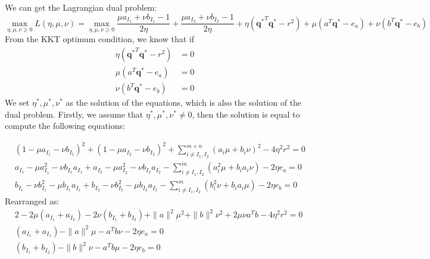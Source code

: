 \documentclass[twoside]{article}
\theoremstyle{plain}
\renewcommand{\vec}[1]{\bm{#1}}
\begin{document}
We can get the Lagrangian dual problem:
\begin{equation}
\max_{\eta,\mu,\nu\geq0} L(\eta,\mu,\nu) = \max_{\eta,\mu,\nu\geq0} \frac{\mu a_{I_1} + \nu b_{I_1}-1}{2\eta} +\frac{\mu a_{I_2} + \nu b_{I_2}-1}{2\eta}+ \eta({\vec{q}^{*}}^T\vec{q}^{*}-r^2 )+\mu( a^T\vec{q}^{*} - e_a ) + \nu( b^T\vec{q}^{*} - e_b )
\end{equation}
From the KKT optimum condition, we know that if
\begin{equation}
\begin{split} 
 \eta ({\vec{q}^{*}}^T\vec{q}^{*} -r^2) &= 0\\
 \mu( a^T\vec{q}^{*} - e_a)&= 0\\
 \nu(b^T\vec{q}^{*} - e_b) &=0
 \end{split}
\end{equation}
We set $\eta^{*}, \mu^{*}, \nu^{*}$ as the solution of the equations, which is also the solution of the dual problem. Firstly, we assume that $\eta^{*}, \mu^{*}, \nu^{*} \neq 0$, then the solution is equal to compute the following equations:

\begin{equation}
\begin{split} 
 & (1-\mu a_{I_1}-\nu b_{I_1})^2 + (1-\mu a_{I_2}-\nu b_{I_2})^2 + \sum^{m+n}_{i\neq I_1,I_2}(a_i\mu+b_i\nu)^2 - 4\eta^2 r^2 = 0 \\
 & a_{I_1}-\mu a_{I_1}^2-\nu b_{I_1}a_{I_1} + a_{I_2}-\mu a_{I_2}^2-\nu b_{I_2}a_{I_2} - \sum^{m}_{i\neq I_1,I_2}(a_i^2\mu +b_i a_i\nu) - 2\eta {e_a} = 0 \\
 & b_{I_1}-\nu b_{I_1}^2-\mu b_{I_1}a_{I_1} + b_{I_2}-\nu b_{I_2}^2-\mu b_{I_2}a_{I_2} - \sum^{m}_{i\neq I_1,I_2}(b_i^2\nu +b_i a_i\mu) - 2\eta {e_b} = 0 
 \end{split}
\end{equation}
Rearranged as:
\begin{equation}
\begin{split} 
 & 2-2\mu (a_{I_1}+a_{I_2})-2\nu(b_{I_1}+b_{I_2})+ \|a\|^2\mu^2+\|b\|^2\nu^2+2\mu\nu a^Tb - 4\eta^2 r^2 = 0 \\
 & (a_{I_1}+ a_{I_1}) - \|a\|^2\mu - a^Tb\nu - 2\eta {e_a} = 0 \\
 & (b_{I_1}+ b_{I_2}) - \|b\|^2\nu - a^Tb \mu - 2\eta {e_b} = 0 
 \end{split}
\end{equation}
\end{document}
